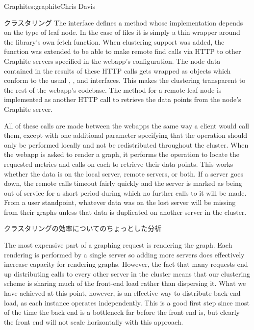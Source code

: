 \begin{aosachapter}{Graphite}{s:graphite}{Chris Davis}
\begin{aosasect1}{クラスタリング}
The  interface defines a  method whose
implementation depends on the type of leaf node. In the case of
 files it is simply a thin wrapper around the  library's
own fetch function.  When clustering support was added, the
 function was extended to be able to make remote find calls
via HTTP to other Graphite servers specified in the webapp's
configuration. The node data contained in the results of these HTTP
calls gets wrapped as  objects which conform to the usual
, , and  interfaces. This makes the clustering
transparent to the rest of the webapp's codebase. The 
method for a remote leaf node is implemented as another HTTP call to
retrieve the data points from the node's Graphite server.

All of these calls are made between the webapps the same way a client
would call them, except with one additional parameter specifying that
the operation should only be performed locally and not be
redistributed throughout the cluster.  When the webapp is asked to
render a graph, it performs the  operation to locate the
requested metrics and calls  on each to retrieve their
data points. This works whether the data is on the local server,
remote servers, or both. If a server goes down, the remote calls
timeout fairly quickly and the server is marked as being out of
service for a short period during which no further calls to it will be
made. From a user standpoint, whatever data was on the lost server
will be missing from their graphs unless that data is duplicated on
another server in the cluster.

\begin{aosasect2}{クラスタリングの効率についてのちょっとした分析}

The most expensive part of a graphing request is rendering the graph.
Each rendering is performed by a single server so adding more servers
does effectively increase capacity for rendering graphs. However, the
fact that many requests end up distributing  calls to every
other server in the cluster means that our clustering scheme is
sharing much of the front-end load rather than dispersing it.  What we
have achieved at this point, however, is an effective way to
distribute back-end load, as each  instance operates
independently.  This is a good first step since most of the time the
back end is a bottleneck far before the front end is, but clearly the
front end will not scale horizontally with this approach.


\end{aosasect2}
\end{aosasect1}
\end{aosachapter}
